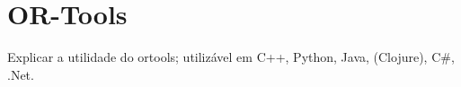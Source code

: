 \documentclass[
12pt,				%
openright,			%
oneside,			%
a4paper,			%
english,			%
french,				%
spanish,			%
brazil,				%
]{abntex2}
\begin{document}
\section{OR-Tools}
\label{sec:ortools}

Explicar a utilidade do ortools; utilizável em C++, Python, Java, (Clojure), C\#, .Net.









\end{document}

